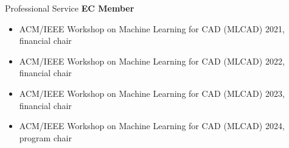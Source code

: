 \begin{rSection}{Professional Service}
\textbf{EC Member}
\begin{itemize}
    \item ACM/IEEE Workshop on Machine Learning for CAD (MLCAD) 2021, financial chair
    \item ACM/IEEE Workshop on Machine Learning for CAD (MLCAD) 2022, financial chair
    \item ACM/IEEE Workshop on Machine Learning for CAD (MLCAD) 2023, financial chair
    \item ACM/IEEE Workshop on Machine Learning for CAD (MLCAD) 2024, program chair
\end{itemize}

\end{rSection}
